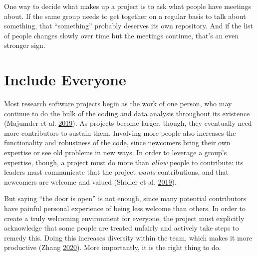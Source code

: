 \documentclass[
]{krantz}
\begin{document}
One way to decide what makes up a project is to ask what people have meetings about.
If the same group needs to get together on a regular basis to talk about something,
that ``something'' probably deserves its own repository.
And if the list of people changes slowly over time but the meetings continue,
that's an even stronger sign.

\hypertarget{teams-inclusive}{%
\section{Include Everyone}\label{teams-inclusive}}

Most research software projects begin as the work of one person,
who may continue to do the bulk of the coding and data analysis throughout its existence (Majumder et al. \protect\hyperlink{ref-Maju2019}{2019}).
As projects become larger,
though,
they eventually need more contributors to sustain them.
Involving more people also increases the functionality and robustness of the code,
since newcomers bring their own expertise or see old problems in new ways.
In order to leverage a group's expertise,
though,
a project must do more than \emph{allow} people to contribute:
its leaders must communicate that the project \emph{wants} contributions,
and that newcomers are welcome and valued (Sholler et al. \protect\hyperlink{ref-Shol2019}{2019}).

But saying ``the door is open'' is not enough,
since many potential contributors have painful personal experience of being less welcome than others.
In order to create a truly welcoming environment for everyone,
the project must explicitly acknowledge that some people are treated unfairly
and actively take steps to remedy this.
Doing this increases diversity within the team,
which makes it more productive (Zhang \protect\hyperlink{ref-Zhan2020}{2020}).
More importantly,
it is the right thing to do.
\end{document}
